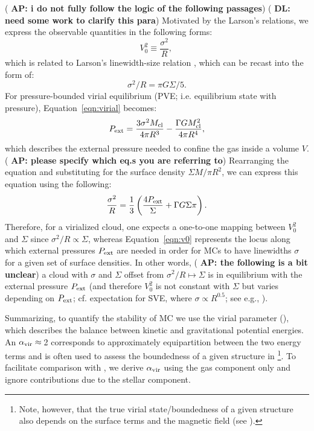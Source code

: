 \IfFileExists{emulateapjlegacy.cls}{\documentclass[iop]{emulateapjlegacy}}{\documentclass[iop]{emulateapj}}
\newcommand{\AP}[1]{({\bf \color{apcolor} AP: #1})}
\newcommand{\DL}[1]{({\bf \color{dlcolor} DL: #1})}
\begin{document}
\AP{i do not fully follow the logic of the following passages}
\DL{need some work to clarify this para}
Motivated by the Larson's relations, we express the observable quantities in the following forms:
\begin{equation}
V_0^2\equiv\frac{\sigma^2}{R},\,
\end{equation}
which is related to Larson's linewidth-size relation \citep{Larson81a}, which can be recast into the form of:
\begin{equation}
\sigma^2/R = \pi G \Sigma/5.
\end{equation}
For pressure-bounded virial equilibrium (PVE; i.e. equilibrium state with pressure), %
Equation~\ref{eqn:virial} becomes:
\begin{equation}
P_{\rm ext} = \frac{3\sigma^2M_{\rm cl}}{4\pi R^3} - \frac{\Gamma G M_{\rm cl}^2}{4\pi R^4},
\label{eqn:pext}
\end{equation}
which describes the external pressure needed to confine the gas inside a volume $V$. \AP{please specify which eq.s you are referring to} Rearranging the equation and substituting for the surface density $\Sigma$\eq$M/\pi R^2$, we can express this equation using the following:
\begin{equation}
\frac{\sigma^2}{R} = \frac{1}{3}\left(\frac{4P_{\rm ext}}{\Sigma} + \Gamma G \Sigma \pi \right).
\label{eqn:v0}
\end{equation}
Therefore, for a virialized cloud, one expects a one-to-one mapping between $V_0^2$ and $\Sigma$ since $\sigma^2/R\propto\Sigma$, whereas Equation~\ref{eqn:v0} represents the locus along which external pressures $P_{\rm ext}$ are needed in order for MCs to have linewidths $\sigma$ for a given set of surface densities. %
In other words, \AP{the following is a bit unclear} a cloud with $\sigma$ and $\Sigma$ offset from $\sigma^2/R\mapsto\Sigma$ is in equilibrium with the external pressure $P_{\rm ext}$ (and therefore $V_0^2$ is not constant with $\Sigma$ but varies depending on $P_{\rm ext}$; cf. expectation for SVE, where $\sigma\propto R^{0.5}$; see e.g., \citealt{Heyer09a, Hughes10a, Hughes13b, Meidt13a}).

Summarizing, to quantify the stability of MC we use the virial parameter (), which describes the balance between kinetic and gravitational potential energies. An $\alpha_{\rm vir}\approx$\,2 corresponds to approximately equipartition between the two energy terms and is often used to assess the boundedness of a given structure in \obs \citep[see e.g., ][]{Kauffmann17b}\footnote{Note, however, that the true virial state/boundedness of a given structure also depends on the surface terms and the magnetic field (see ).}.
To facilitate comparison with \obs, we derive $\alpha_{\rm vir}$ using the gas component only and ignore contributions due to 
the stellar component. 
\end{document}

